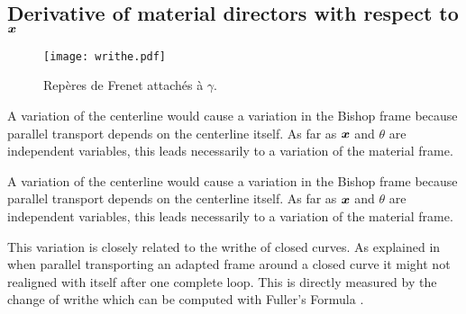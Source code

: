 \subsection{Derivative of material directors with respect to $\boldsymbol{x}$}

\begin{figure}[t] 
\centering 
\texttt{[image: writhe.pdf]} 
\caption{Repères de Frenet attachés à $\gamma$.}
\label{fig:1_1}
\end{figure}

A variation of the centerline would cause a variation in the Bishop frame because parallel transport depends on the centerline itself. As far as $\boldsymbol{x}$ and $\theta$ are independent variables, this leads necessarily to a variation of the material frame.

A variation of the centerline would cause a variation in the Bishop frame because parallel transport depends on the centerline itself. As far as $\boldsymbol{x}$ and $\theta$ are independent variables, this leads necessarily to a variation of the material frame.

This variation is closely related to the writhe of closed curves. As explained in \cite{Fuller1978} when parallel transporting an adapted frame around a closed curve it might not realigned with itself after one complete loop. This  is directly measured by the change of writhe which can be computed with Fuller's Formula \cite{Fuller1978}.

